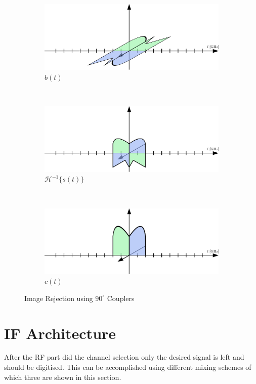 \begin{figure}[ht]
\begin{subfigure}{0.45\textwidth}
    \includegraphics[width=\textwidth]{figures/rx_rf_0_freq_b}
    \caption{$b(t)$}
    \label{fig:rx_rf_0_freq_b}
  \end{subfigure}
  \vspace{4ex} \\
  \begin{subfigure}{0.45\textwidth}
    \centering
    \includegraphics[width=\textwidth]{figures/rx_rf_0_freq_Hb}
    \caption{$\mathcal{H}^{-1}\{s(t)\}$}
    \label{fig:rx_rf_0_freq_Hb}
  \end{subfigure}
  ~
  \begin{subfigure}{0.45\textwidth}
    \centering
    \includegraphics[width=\textwidth]{figures/rx_rf_0_freq_c}
    \caption{$c(t)$}
    \label{fig:rx_rf_0_freq_c}
  \end{subfigure}
  \caption{Image Rejection using $90^\circ$ Couplers}
  \label{fig:rx_rf_0_freq}
\end{figure}

\section{IF Architecture}
After the \gls{RF} part did the channel selection only the desired signal
is left and should be digitised.
This can be accomplished using different
mixing schemes of which three are shown in this section. \\

